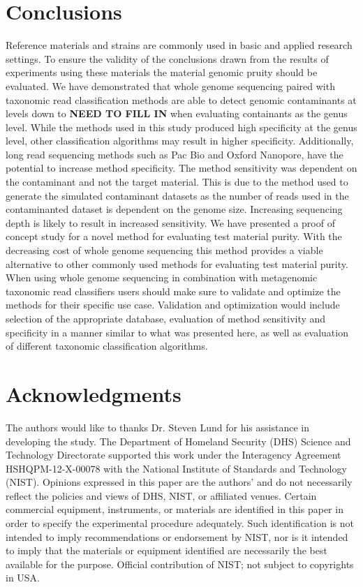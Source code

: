 \documentclass[fleqn,10pt,lineno]{wlpeerj}\usepackage[]{graphicx}\usepackage[]{color}
\begin{document}
\section*{Conclusions} 
Reference materials and strains are commonly used in basic and applied research settings. 
To ensure the validity of the conclusions drawn from the results of experiments using these materials the material genomic pruity should be evaluated. 
We have demonstrated that whole genome sequencing paired with taxonomic read classification methods are able to detect genomic contaminants at levels down to \textbf{NEED TO FILL IN} when evaluating containants as the genus level. 
While the methods used in this study produced high specificity at the genus level, other classification algorithms may result in higher specificity. 
Additionally, long read sequencing methods such as Pac Bio and Oxford Nanopore, have the potential to increase method specificity. 
The method sensitivity was dependent on the contaminant and not the target material.
This is due to the method used to generate the simulated contaminant datasets as the number of reads used in the contaminanted dataset is dependent on the genome size. 
Increasing sequencing depth is likely to result in increased sensitivity.
We have presented a proof of concept study for a novel method for evaluating test material purity. 
With the decreasing cost of whole genome sequencing this method provides a viable alternative to other commonly used methods for evaluating test material purity. 
When using whole genome sequencing in combination with metagenomic taxonomic read classifiers users should make sure to validate and optimize the methods for their specific use case. 
Validation and optimization would include selection of the appropriate database, evaluation of method sensitivity and specificity in a manner similar to what was presented here, as well as evaluation of different taxonomic classification algorithms.
\newpage

\section*{Acknowledgments}

The authors would like to thanks Dr. Steven Lund for his assistance in developing the study. 
The Department of Homeland Security (DHS) Science and Technology Directorate supported this work under the Interagency Agreement HSHQPM-12-X-00078 with the National Institute of Standards and Technology (NIST). 
Opinions expressed in this paper are the authors’ and do not necessarily reflect the policies and views of DHS,  NIST, or affiliated venues. 
Certain commercial equipment, instruments, or materials are identified in this paper in order to specify the experimental procedure adequately. 
Such identification is not intended to imply recommendations or endorsement by NIST, 
nor is it intended to imply that the materials or equipment identified are necessarily the best available for the purpose. 
Official contribution of NIST; not subject to copyrights in USA.


\end{document}
